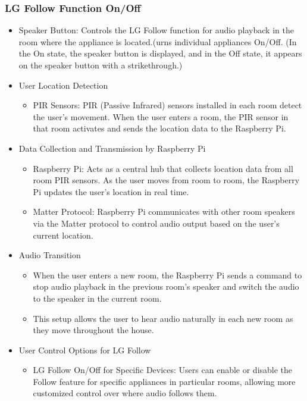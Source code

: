 \documentclass[conference]{IEEEtran}
\begin{document}
\subsubsection{LG Follow Function On/Off}
\begin{itemize}
    \item Speaker Button: Controls the LG Follow function for audio playback in the room where the appliance is located.(urns individual appliances On/Off. (In the On state, the speaker button is displayed, and in the Off state, it appears on the speaker button with a strikethrough.)\\
    \item User Location Detection
\begin{itemize}
    \item PIR Sensors: PIR (Passive Infrared) sensors installed in each room detect the user’s movement. When the user enters a room, the PIR sensor in that room activates and sends the location data to the Raspberry Pi.\\
\end{itemize}
\end{itemize}
\begin{itemize}
    \item Data Collection and Transmission by Raspberry Pi
\begin{itemize}
    \item Raspberry Pi: Acts as a central hub that collects location data from all room PIR sensors. As the user moves from room to room, the Raspberry Pi updates the user’s location in real time.\\
    \item Matter Protocol: Raspberry Pi communicates with other room speakers via the Matter protocol to control audio output based on the user’s current location.\\
\end{itemize}
\end{itemize}
\begin{itemize}
    \item Audio Transition
\begin{itemize}
    \item When the user enters a new room, the Raspberry Pi sends a command to stop audio playback in the previous room’s speaker and switch the audio to the speaker in the current room.\\
    \item This setup allows the user to hear audio naturally in each new room as they move throughout the house.\\
\end{itemize}
\end{itemize}
\begin{itemize}
    \item User Control Options for LG Follow
\begin{itemize}
    \item LG Follow On/Off for Specific Devices: Users can enable or disable the Follow feature for specific appliances in particular rooms, allowing more customized control over where audio follows them.\\
\end{itemize}
\end{itemize}
\end{document}
